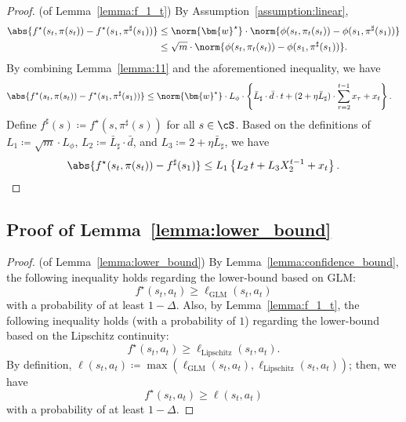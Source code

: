 \smallskip
\begin{proof}(of Lemma~\ref{lemma:f_1_t})
    By Assumption~\ref{assumption:linear},
    \begin{align*}
        \abs{f^\star(s_t, \pi(s_t)) - f^\star(s_1, \pi^\sharp(s_1))}
        & \le \norm{\bm{w}^\star} \cdot \norm{\phi(s_t, \pi_t(s_t)) - \phi(s_1, \pi^\sharp(s_1))} \\
        & \le \sqrt{m} \cdot \norm{\phi(s_t, \pi_t(s_t)) - \phi(s_1, \pi^\sharp(s_1))}.
    \end{align*}
    By combining Lemma~\ref{lemma:11} and the aforementioned inequality, we have
    \begin{align*}
        \abs{f^\star(s_t, \pi(s_t)) - f^\star(s_1, \pi^\sharp(s_1))}
        & \le \norm{\bm{w}^\star} \cdot L_\phi \cdot \left\{\bar{L}_\sharp \cdot \bar{d} \cdot t + (2 + \eta \bar{L}_\sharp) \cdot \sum_{\tau=2}^{t-1} x_\tau + x_{t} \right\}.
    \end{align*}
    Define $f^\sharp(s) \coloneqq f^\star(s, \pi^\sharp(s))$ for all $s \in \cS$.
    Based on the definitions of $L_1 \coloneqq \sqrt{m} \cdot L_\phi$, $L_2 \coloneqq \bar{L}_\sharp \cdot \bar{d}$, and $L_3 \coloneqq 2 + \eta \bar{L}_\sharp$, we have
    \begin{align*}
        \abs{f^\star(s_t, \pi(s_t)) - f^\sharp(s_1)}
        \le L_1 \left\{L_2 \, t + L_3 X_{2}^{t-1} + x_{t} \right\}.
    \end{align*}
\end{proof}

\subsection{Proof of Lemma~\ref{lemma:lower_bound}}
\label{appendix:A_5}

\begin{proof}(of Lemma~\ref{lemma:lower_bound})
    By Lemma~\ref{lemma:confidence_bound}, the following inequality holds regarding the lower-bound based on GLM:
    \begin{equation}
        f^\star(s_t, a_t) \ge \ell_{\text{GLM}}(s_t, a_t)
    \end{equation}
    with a probability of at least $1 - \Delta$.
    Also, by Lemma~\ref{lemma:f_1_t}, the following inequality holds (with a probability of $1$) regarding the lower-bound based on the Lipschitz continuity:
    \begin{equation}
        f^\star(s_t, a_t) \ge \ell_{\text{Lipschitz}}(s_t, a_t).
    \end{equation}
    By definition, $\ell(s_t, a_t) \coloneqq \max(\ell_\text{GLM}(s_t, a_t), \ell_\text{Lipschitz}(s_t, a_t))$; then, we have
    \begin{equation}
        f^\star(s_t, a_t) \ge \ell(s_t, a_t)
    \end{equation}
    with a probability of at least $1 - \Delta$.
\end{proof}


